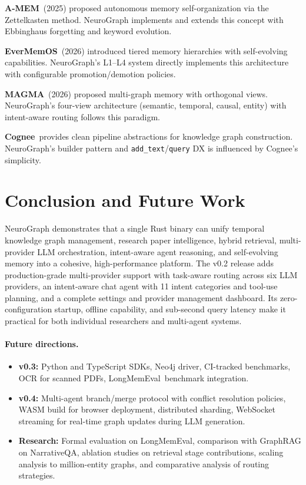 \documentclass[11pt,twocolumn]{article}
\begin{document}
\textbf{A-MEM}~(2025) proposed autonomous memory self-organization via the Zettelkasten method. NeuroGraph implements and extends this concept with Ebbinghaus forgetting and keyword evolution.

\textbf{EverMemOS}~(2026) introduced tiered memory hierarchies with self-evolving capabilities. NeuroGraph's L1--L4 system directly implements this architecture with configurable promotion/demotion policies.

\textbf{MAGMA}~(2026) proposed multi-graph memory with orthogonal views. NeuroGraph's four-view architecture (semantic, temporal, causal, entity) with intent-aware routing follows this paradigm.

\textbf{Cognee}~provides clean pipeline abstractions for knowledge graph construction. NeuroGraph's builder pattern and \texttt{add\_text}/\texttt{query} DX is influenced by Cognee's simplicity.

\section{Conclusion and Future Work}
\label{sec:conclusion}

NeuroGraph demonstrates that a single Rust binary can unify temporal knowledge graph management, research paper intelligence, hybrid retrieval, multi-provider LLM orchestration, intent-aware agent reasoning, and self-evolving memory into a cohesive, high-performance platform. The v0.2 release adds production-grade multi-provider support with task-aware routing across six LLM providers, an intent-aware chat agent with 11 intent categories and tool-use planning, and a complete settings and provider management dashboard. Its zero-configuration startup, offline capability, and sub-second query latency make it practical for both individual researchers and multi-agent systems.

\paragraph{Future directions.}
\begin{itemize}[nosep]
  \item \textbf{v0.3:} Python and TypeScript SDKs, Neo4j driver, CI-tracked benchmarks, OCR for scanned PDFs, LongMemEval~benchmark integration.
  \item \textbf{v0.4:} Multi-agent branch/merge protocol with conflict resolution policies, WASM build for browser deployment, distributed sharding, WebSocket streaming for real-time graph updates during LLM generation.
  \item \textbf{Research:} Formal evaluation on LongMemEval, comparison with GraphRAG on NarrativeQA, ablation studies on retrieval stage contributions, scaling analysis to million-entity graphs, and comparative analysis of routing strategies.
\end{itemize}
\end{document}
